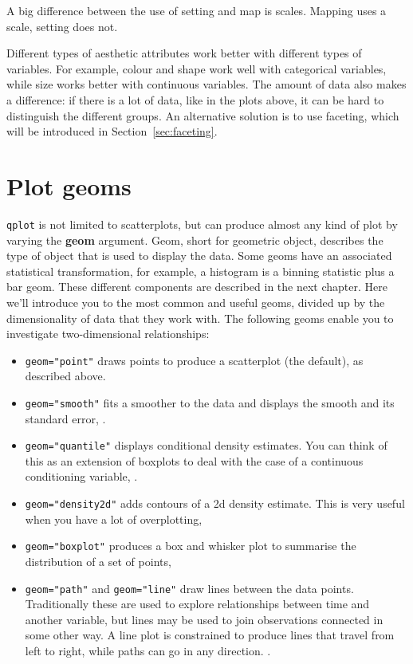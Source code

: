 A big difference between the use of setting and map is scales.  Mapping uses a scale, setting does not.



Different types of aesthetic attributes work better with different types of variables.  For example, colour and shape work well with categorical variables, while size works better with continuous variables.  The amount of data also makes a difference: if there is a lot of data, like in the plots above, it can be hard to distinguish the different groups.  An alternative solution is to use faceting, which will be introduced in Section~\ref{sec:faceting}.

\section{Plot geoms}\label{sec:plot_geoms}

{\tt qplot} is not limited to scatterplots, but can produce almost any kind of plot by varying the {\bf geom} argument. Geom, short for geometric object, describes the type of object that is used to display the data.  Some geoms have an associated statistical transformation, for example, a histogram is a binning statistic plus a bar geom.  These different components are described in the next chapter.  Here we'll introduce you to the most common and useful geoms, divided up by the dimensionality of data that they work with.  The following geoms enable you to investigate two-dimensional relationships:

\begin{itemize}

  \item {\tt geom="point"} draws points to produce a scatterplot (the default), as described above.

  \item {\tt geom="smooth"} fits a smoother to the data and displays the smooth and its standard error, .

  \item {\tt geom="quantile"} displays conditional density estimates.  You can think of this as an extension of boxplots to deal with the case of a continuous conditioning variable, .

  \item {\tt geom="density2d"} adds contours of a 2d density estimate.  This is very useful when you have a lot of overplotting, 

  \item {\tt geom="boxplot"} produces a box and whisker plot to summarise the distribution of a set of points, 

  \item {\tt geom="path"} and {\tt geom="line"} draw lines between the data points.  Traditionally these are used to explore relationships between time and another variable, but lines may be used to join observations connected in some other way.  A line plot is constrained to produce lines that travel from left to right, while paths can go in any direction.  .
\end{itemize}

